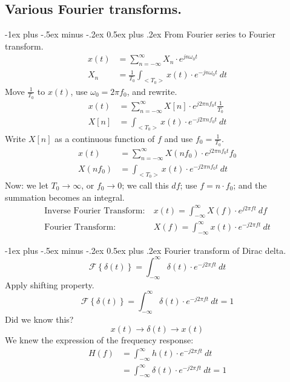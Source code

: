 \documentclass[10pt,landscape,a4paper]{article}
\makeatletter
\newcommand{\F}{\mathscr{F}}
\renewcommand{\section}{\@startsection{section}{1}{0mm}%
	{-1ex plus -.5ex minus -.2ex}%
	{0.5ex plus .2ex}%
	{\normalfont\large\bfseries}}
\makeatother
\begin{document}
\begin{multicols}{3}
	
	\newpage
	\part*{Various Fourier transforms.}
	
	\section{From Fourier series to Fourier transform.}
	\begin{align*}
		x(t) & =\sum_{n=-\infty}^{\infty}{X_n\cdot e^{jn\omega_0t}}      \\
		X_n  & =\frac{1}{T_0}\int_{<T_0>}{x(t)\cdot e^{-jn\omega_0t}~dt}
	\end{align*}
	Move $ \frac{1}{T_0} $ to $ x(t) $, use $ \omega_0=2\pi f_0 $, and rewrite.
	\begin{align*}
		x(t) & =\sum_{n=-\infty}^{\infty}{X[n]\cdot e^{j2\pi nf_0t}\frac{1}{T_0}} \\
		X[n] & =\int_{<T_0>}{x(t)\cdot e^{-j2\pi nf_0t}~dt}
	\end{align*}
	Write $ X[n] $ as a continuous function of $ f $ and use $ f_0=\frac{1}{T_0} $.
	\begin{align*}
		x(t)    & =\sum_{n=-\infty}^{\infty}{X(nf_0)\cdot e^{j2\pi nf_0t}f_0} \\
		X(nf_0) & =\int_{<T_0>}{x(t)\cdot e^{-j2\pi nf_0t}~dt}
	\end{align*}
	Now: we let $ T_0 \rightarrow \infty $, or $ f_0 \rightarrow 0 $; we call this $ df $; use $ f=n\cdot f_0 $; and the summation becomes an integral.
	\begin{align*}
		\text{Inverse Fourier Transform:}~ & x(t) = \int_{-\infty}^{\infty}{X(f)\cdot e^{j2\pi ft}~df}  \\
		\text{Fourier Transform:}~         & X(f) = \int_{-\infty}^{\infty}{x(t)\cdot e^{-j2\pi ft}~dt}
	\end{align*}
	
	\section{Fourier transform of Dirac delta.}
	\[
		\F\left\{\delta(t)\right\}=\int_{-\infty}^{\infty}{\delta(t)\cdot e^{-j2\pi ft}~dt}
	\]
	Apply shifting property.
	\[
		\F\left\{\delta(t)\right\}=\int_{-\infty}^{\infty}{\delta(t)\cdot e^{-j2\pi ft}~dt} = 1
	\]
	Did we know this?
	\[
		x(t)\rightarrow\boxed{\delta(t)}\rightarrow x(t)
	\]
	We knew the expression of the frequency response:
	\begin{align*}
		H(f) & =\int_{-\infty}^{\infty}{h(t)\cdot e^{-j2\pi ft}~dt}        \\
		     & =\int_{-\infty}^{\infty}{\delta(t)\cdot e^{-j2\pi ft}~dt}=1
	\end{align*}
	

\end{multicols}
\end{document}
